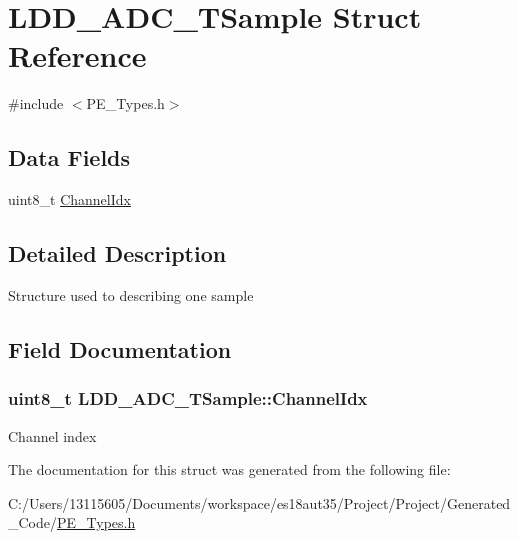 \hypertarget{struct_l_d_d___a_d_c___t_sample}{}\section{L\+D\+D\+\_\+\+A\+D\+C\+\_\+\+T\+Sample Struct Reference}
\label{struct_l_d_d___a_d_c___t_sample}


{\ttfamily \#include $<$P\+E\+\_\+\+Types.\+h$>$}

\subsection*{Data Fields}
\begin{DoxyCompactItemize}
\item 
uint8\+\_\+t \hyperlink{struct_l_d_d___a_d_c___t_sample_ae2737bdf799311a9bc9f7acf30f569c1}{Channel\+Idx}
\end{DoxyCompactItemize}


\subsection{Detailed Description}
Structure used to describing one sample 

\subsection{Field Documentation}
\hypertarget{struct_l_d_d___a_d_c___t_sample_ae2737bdf799311a9bc9f7acf30f569c1}{}
\subsubsection[{Channel\+Idx}]{\setlength{\rightskip}{0pt plus 5cm}uint8\+\_\+t L\+D\+D\+\_\+\+A\+D\+C\+\_\+\+T\+Sample\+::\+Channel\+Idx}\label{struct_l_d_d___a_d_c___t_sample_ae2737bdf799311a9bc9f7acf30f569c1}
Channel index 

The documentation for this struct was generated from the following file\+:\begin{DoxyCompactItemize}
\item 
C\+:/\+Users/13115605/\+Documents/workspace/es18aut35/\+Project/\+Project/\+Generated\+\_\+\+Code/\hyperlink{_p_e___types_8h}{P\+E\+\_\+\+Types.\+h}\end{DoxyCompactItemize}
